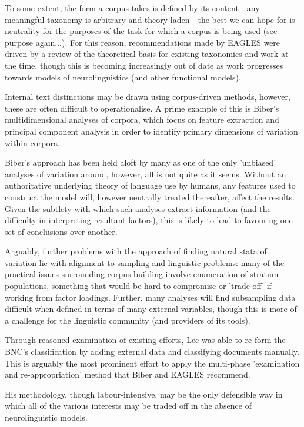 To some extent, the form a corpus takes is defined by its content---any meaningful taxonomy is arbitrary and theory-laden---the best we can hope for is neutrality for the purposes of the task for which a corpus is being used (see purpose again...).  For this reason, recommendations made by EAGLES were driven by a review of the theoretical basis for existing taxonomies and work at the time, though this is becoming increasingly out of date as work progresses towards models of neurolinguistics (and other functional models).


Internal text distinctions may be drawn using corpus-driven methods, however, these are often difficult to operationalise.  A prime example of this is Biber's multidimensional analyses of corpora, which focus on feature extraction and principal component analysis in order to identify primary dimensions of variation within corpora.

Biber's approach has been held aloft by many as one of the only 'unbiased' analyses of variation around, however, all is not quite as it seems.  Without an authoritative underlying theory of language use by humans, any features used to construct the model will, however neutrally treated thereafter, affect the results.  Given the subtlety with which such analyses extract information (and the difficulty in interpreting resultant factors), this is likely to lead to favouring one set of conclusions over another.

Arguably, further problems with the approach of finding natural stata of variation lie with alignment to sampling and linguistic problems: many of the practical issues surrounding corpus building involve enumeration of stratum populations, something that would be hard to compromise or 'trade off' if working from factor loadings.  Further, many analyses will find subsampling data difficult when defined in terms of many external variables, though this is more of a challenge for the linguistic community (and providers of its tools).


Through reasoned examination of existing efforts, Lee %
was able to re-form the BNC's classification by adding external data and classifying documents manually.  This is arguably the most prominent effort to apply the multi-phase 'examination and re-appropriation' method that Biber and EAGLES recommend.


His methodology, though labour-intensive, may be the only defensible way in which all of the various interests may be traded off in the absence of neurolinguistic models.  %

